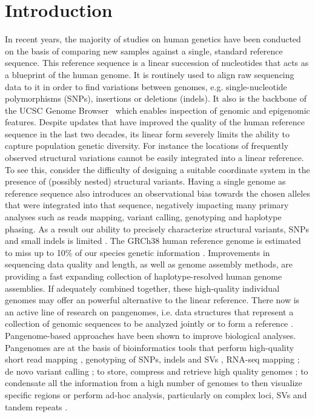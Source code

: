 \section{Introduction}
In recent years, the majority of studies on human genetics have been conducted on the basis of comparing new samples against a single, standard reference sequence. This reference sequence is a linear succession of nucleotides that acts as a blueprint of the human genome. It is routinely used to align raw sequencing data to it in order to find variations between genomes, e.g. single-nucleotide polymorphisms (SNPs), insertions or deletions (indels). It also is the backbone of the UCSC Genome Browser~\cite{ucsc} which enables inspection of genomic and epigenomic features. Despite updates that have improved the quality of the human reference sequence in the last two decades, its linear form severely limits the ability to capture population genetic diversity. For instance the locations of frequently observed structural variations cannot be easily integrated into a linear reference. To see this, consider the difficulty of designing a suitable coordinate system in the presence of (possibly nested) structural variants. Having a single genome as reference sequence also introduces an observational bias towards the chosen alleles that were integrated into that sequence, negatively impacting many primary analyses such as reads mapping, variant calling, genotyping and haplotype phasing. As a result our ability to precisely characterize structural variants, SNPs and small indels is limited \cite{vg,computational_pangenomics,giraffe}. The GRCh38 human reference genome is estimated to miss up to 10\% of our species genetic information \mbox{\cite{human-pangenomics-era}}.
Improvements in sequencing data quality and length, as well as  genome assembly methods, are providing a fast expanding collection of haplotype-resolved human genome assemblies. If adequately combined together, these high-quality individual genomes may offer an powerful alternative to the linear reference. There now is an active line of research on pangenomes, i.e. data structures that represent a collection of genomic sequences to be analyzed jointly or to form a reference \cite{computational_pangenomics,hpp}. 
Pangenome-based approaches have been shown to improve biological analyses. Pangenomes are at the basis of bioinformatics tools that perform high-quality short read mapping \mbox{\cite{giraffe}}, genotyping of SNPs, indels and SVs \mbox{\cite{pangenie}}, RNA-seq mapping \mbox{\cite{hdpr}}; de novo variant calling \mbox{\cite{vg}}; to store, compress and retrieve high quality genomes \mbox{\cite{gbz}}; to condensate all the information from a high number of genomes to then visualize specific regions or perform ad-hoc analysis, particularly on complex loci, SVs and tandem repeats \mbox{\cite{hdpr}}.
